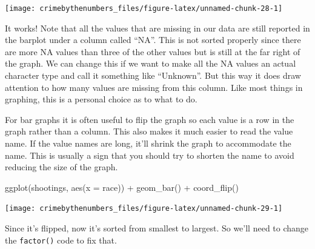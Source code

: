 \documentclass[
  12pt,
  openany]{book}
\newenvironment{Shaded}{\begin{snugshade}}{\end{snugshade}}
\newcommand{\AttributeTok}[1]{\textcolor[rgb]{0.61,0.61,0.61}{#1}}
\newcommand{\ConstantTok}[1]{\textcolor[rgb]{0,0,0}{#1}}
\newcommand{\FunctionTok}[1]{\textcolor[rgb]{0,0,0}{#1}}
\newcommand{\NormalTok}[1]{#1}
\newcommand{\OtherTok}[1]{\textcolor[rgb]{0.37,0.37,0.37}{#1}}
\newcommand{\SpecialCharTok}[1]{\textcolor[rgb]{0,0,0}{#1}}
\begin{document}
\begin{center}\texttt{[image: crimebythenumbers\_files/figure-latex/unnamed-chunk-28-1]} \end{center}

It works! Note that all the values that are missing in our data are still reported in the barplot under a column called ``NA''. This is not sorted properly since there are more NA values than three of the other values but is still at the far right of the graph. We can change this if we want to make all the NA values an actual character type and call it something like ``Unknown''. But this way it does draw attention to how many values are missing from this column. Like most things in graphing, this is a personal choice as to what to do.

For bar graphs it is often useful to flip the graph so each value is a row in the graph rather than a column. This also makes it much easier to read the value name. If the value names are long, it'll shrink the graph to accommodate the name. This is usually a sign that you should try to shorten the name to avoid reducing the size of the graph.

\begin{Shaded}
\begin{Highlighting}[]
\FunctionTok{ggplot}\NormalTok{(shootings, }\FunctionTok{aes}\NormalTok{(}\AttributeTok{x =}\NormalTok{ race)) }\SpecialCharTok{+} 
  \FunctionTok{geom\_bar}\NormalTok{() }\SpecialCharTok{+}
  \FunctionTok{coord\_flip}\NormalTok{() }
\end{Highlighting}
\end{Shaded}

\begin{center}\texttt{[image: crimebythenumbers\_files/figure-latex/unnamed-chunk-29-1]} \end{center}

Since it's flipped, now it's sorted from smallest to largest. So we'll need to change the \texttt{factor()} code to fix that.

\begin{Shaded}
\end{Shaded}
\end{document}
